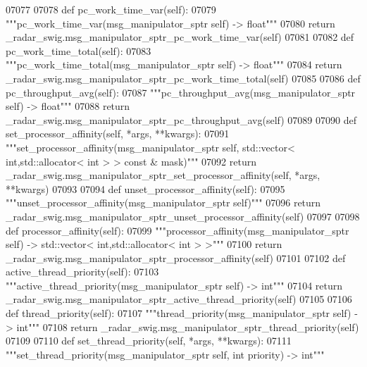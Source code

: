 \begin{DoxyCode}
{{{{{{{{{{{{{{{{{{{{{{{07077 
07078     \textcolor{keyword}{def }pc_work_time_var(self):
07079         \textcolor{stringliteral}{"""pc\_work\_time\_var(msg\_manipulator\_sptr self) -> float"""}
07080         \textcolor{keywordflow}{return} \_radar\_swig.msg\_manipulator\_sptr\_pc\_work\_time\_var(self)
07081 
07082     \textcolor{keyword}{def }pc_work_time_total(self):
07083         \textcolor{stringliteral}{"""pc\_work\_time\_total(msg\_manipulator\_sptr self) -> float"""}
07084         \textcolor{keywordflow}{return} \_radar\_swig.msg\_manipulator\_sptr\_pc\_work\_time\_total(self)
07085 
07086     \textcolor{keyword}{def }pc_throughput_avg(self):
07087         \textcolor{stringliteral}{"""pc\_throughput\_avg(msg\_manipulator\_sptr self) -> float"""}
07088         \textcolor{keywordflow}{return} \_radar\_swig.msg\_manipulator\_sptr\_pc\_throughput\_avg(self)
07089 
07090     \textcolor{keyword}{def }set_processor_affinity(self, *args, **kwargs):
07091         \textcolor{stringliteral}{"""set\_processor\_affinity(msg\_manipulator\_sptr self, std::vector< int,std::allocator< int > > const
       & mask)"""}
07092         \textcolor{keywordflow}{return} \_radar\_swig.msg\_manipulator\_sptr\_set\_processor\_affinity(self, *args, **kwargs)
07093 
07094     \textcolor{keyword}{def }unset_processor_affinity(self):
07095         \textcolor{stringliteral}{"""unset\_processor\_affinity(msg\_manipulator\_sptr self)"""}
07096         \textcolor{keywordflow}{return} \_radar\_swig.msg\_manipulator\_sptr\_unset\_processor\_affinity(self)
07097 
07098     \textcolor{keyword}{def }processor_affinity(self):
07099         \textcolor{stringliteral}{"""processor\_affinity(msg\_manipulator\_sptr self) -> std::vector< int,std::allocator< int > >"""}
07100         \textcolor{keywordflow}{return} \_radar\_swig.msg\_manipulator\_sptr\_processor\_affinity(self)
07101 
07102     \textcolor{keyword}{def }active_thread_priority(self):
07103         \textcolor{stringliteral}{"""active\_thread\_priority(msg\_manipulator\_sptr self) -> int"""}
07104         \textcolor{keywordflow}{return} \_radar\_swig.msg\_manipulator\_sptr\_active\_thread\_priority(self)
07105 
07106     \textcolor{keyword}{def }thread_priority(self):
07107         \textcolor{stringliteral}{"""thread\_priority(msg\_manipulator\_sptr self) -> int"""}
07108         \textcolor{keywordflow}{return} \_radar\_swig.msg\_manipulator\_sptr\_thread\_priority(self)
07109 
07110     \textcolor{keyword}{def }set_thread_priority(self, *args, **kwargs):
07111         \textcolor{stringliteral}{"""set\_thread\_priority(msg\_manipulator\_sptr self, int priority) -> int"""}
}}}}}}}}}}}}}}}}}}}}}}}
\end{DoxyCode}
